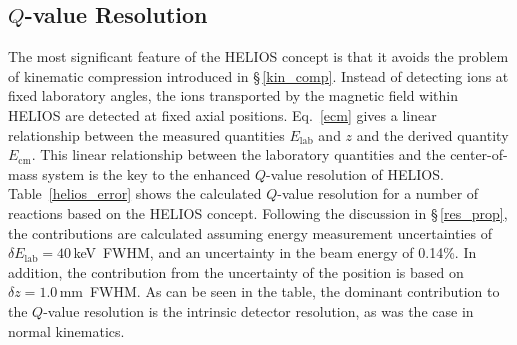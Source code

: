\subsection{\texorpdfstring{$Q$-value Resolution}{Q-value Resolution}}
The most significant feature of the HELIOS concept is that it avoids the problem of kinematic compression introduced in \S\,\ref{kin_comp}.  Instead of detecting ions %
at fixed laboratory angles, the ions transported by the magnetic field within HELIOS are %
detected at 
fixed axial positions.  Eq.~\ref{ecm} gives a linear relationship between the measured quantities $E_\mathrm{lab}$ and $z$ and the derived quantity $E_\mathrm{cm}$.  This linear relationship between the laboratory quantities and the center-of-mass system is the key to the enhanced $Q$-value resolution of HELIOS.  Table~\ref{helios_error} shows the calculated $Q$-value resolution for a number of reactions based on the HELIOS concept.  Following the discussion in \S\,\ref{res_prop}, the contributions are calculated assuming energy measurement uncertainties of $\delta E_\mathrm{lab}=40$\,keV~FWHM, and an uncertainty in the beam energy of 0.14\%. In addition, the contribution from the uncertainty of the position is based on $\delta z=1.0$\,mm~FWHM.  As can be seen in the table, the dominant contribution to the $Q$-value resolution is the intrinsic detector resolution, as was the case in normal kinematics.

